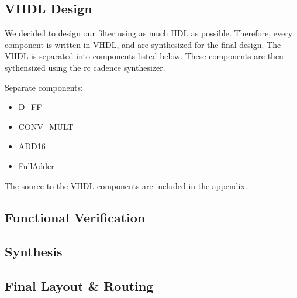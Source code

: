 \subsection{VHDL Design}
We decided to design our filter using as much HDL as possible.  Therefore, every component is written in VHDL, and are synthesized for the final design. The VHDL is separated into components listed below.  These components are then sythensized using the rc cadence synthesizer.  

Separate components:
\begin{itemize}
\item D\_FF
\item CONV\_MULT
\item ADD16
\item FullAdder
\end{itemize}

The source to the VHDL components are included in the appendix.  

\subsection{Functional Verification}



\subsection{Synthesis}



\subsection{Final Layout \& Routing}
